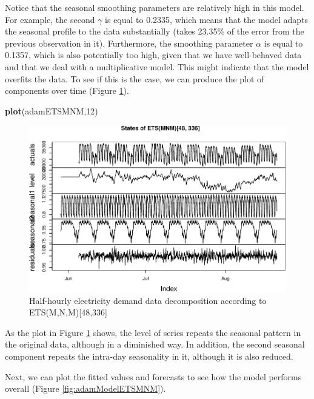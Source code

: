 \documentclass[]{book}
\newenvironment{Shaded}{\begin{snugshade}}{\end{snugshade}}
\newcommand{\DecValTok}[1]{\textcolor[rgb]{0.00,0.00,0.81}{#1}}
\newcommand{\KeywordTok}[1]{\textcolor[rgb]{0.13,0.29,0.53}{\textbf{#1}}}
\newcommand{\NormalTok}[1]{#1}
\theoremstyle{definition}
\theoremstyle{definition}
\theoremstyle{definition}
\theoremstyle{definition}
\theoremstyle{remark}
\begin{document}
Notice that the seasonal smoothing parameters are relatively high in this model. For example, the second \(\gamma\) is equal to 0.2335, which means that the model adapts the seasonal profile to the data substantially (takes 23.35\% of the error from the previous observation in it). Furthermore, the smoothing parameter \(\alpha\) is equal to 0.1357, which is also potentially too high, given that we have well-behaved data and that we deal with a multiplicative model. This might indicate that the model overfits the data. To see if this is the case, we can produce the plot of components over time (Figure \ref{fig:adamModelETSMNM12}).

\begin{Shaded}
\begin{Highlighting}[]
\KeywordTok{plot}\NormalTok{(adamETSMNM,}\DecValTok{12}\NormalTok{)}
\end{Highlighting}
\end{Shaded}

\begin{figure}
\centering
\includegraphics{Svetunkov--2022----ADAM_files/figure-latex/adamModelETSMNM12-1.pdf}
\caption{\label{fig:adamModelETSMNM12}Half-hourly electricity demand data decomposition according to ETS(M,N,M){[}48,336{]}}
\end{figure}

As the plot in Figure \ref{fig:adamModelETSMNM12} shows, the level of series repeats the seasonal pattern in the original data, although in a diminished way. In addition, the second seasonal component repeats the intra-day seasonality in it, although it is also reduced.

Next, we can plot the fitted values and forecasts to see how the model performs overall (Figure \ref{fig:adamModelETSMNM}).
\end{document}
